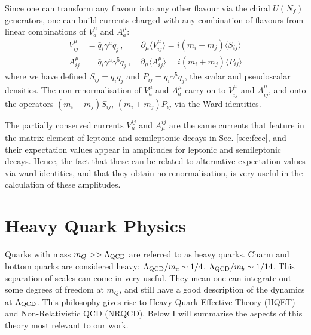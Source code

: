
Since one can transform any flavour into any other flavour via the chiral $U(N_f)$ generators, one can build currents charged with any combination of flavours from linear combinations of $V_a^{\mu}$ and $A_a^{\mu}$:
\begin{align}
  \label{eq:vector_ward_indiv}
  V_{ij}^{\mu} &= \bar{q}_i \gamma^{\mu} q_j \,,\quad\quad \partial_{\mu}\langle V^{\mu}_{ij} \rangle = i ( m_i - m_j ) \langle S_{ij} \rangle \\
  A_{ij}^{\mu} &= \bar{q}_i \gamma^{\mu}\gamma^5 q_j \,,\quad \partial_{\mu}\langle A^{\mu}_{ij} \rangle = i ( m_i + m_j ) \langle P_{ij} \rangle
  \label{eq:axial_ward_indiv}
\end{align}
where we have defined $S_{ij} = \bar{q}_iq_j$ and $P_{ij} = \bar{q}_i\gamma^5 q_j$, the scalar and pseudoscalar densities. The non-renormalisation of $V_a^{\mu}$ and $A_a^{\mu}$ carry on to $V_{ij}^{\mu}$ and $A_{ij}^{\mu}$, and onto the operators $( m_i - m_j ) S_{ij}$, $( m_i + m_j ) P_{ij}$ via the Ward identities.

The partially conserved currents $V^{ij}_{\mu}$ and $A^{ij}_{\mu}$ are the same currents that feature in the matrix element of leptonic and semileptonic decays in Sec. \ref{sec:fccc}, and their expectation values appear in amplitudes for leptonic and semileptonic decays. Hence, the fact that these can be related to alternative expectation values via ward identities, and that they obtain no renormalisation, is very useful in the calculation of these amplitudes.

\section{Heavy Quark Physics}

Quarks with mass $m_Q >> \Lambda_{\text{QCD}}$ are referred to as heavy quarks. Charm and bottom quarks are considered heavy: $\Lambda_{\text{QCD}}/m_c \sim 1/4$, $\Lambda_{\text{QCD}}/m_b \sim 1/14$. This separation of scales can come in very useful. They mean one can integrate out some degrees of freedom at $m_Q$, and still have a good description of the dynamics at $\Lambda_{\text{QCD}}$. This philosophy gives rise to Heavy Quark Effective Theory (HQET) and Non-Relativistic QCD (NRQCD). Below I will summarise the aspects of this theory most relevant to our work.

